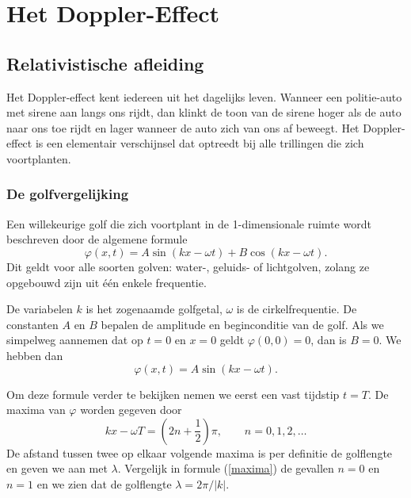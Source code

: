 \chapter{Het Doppler-Effect}


\section{Relativistische afleiding}
Het Doppler-effect kent iedereen uit het dagelijks leven. Wanneer een
politie-auto met sirene aan langs ons rijdt, dan klinkt de toon van de
sirene hoger als de auto naar ons toe rijdt en lager wanneer de auto
zich van ons af beweegt.  Het Doppler-effect is een elementair
verschijnsel dat optreedt bij alle trillingen die zich voortplanten.

\subsection{De golfvergelijking}
Een willekeurige golf die zich voortplant in de 1-dimensionale ruimte
wordt beschreven door de algemene formule
%
\begin{equation} 
\varphi(x,t) = A \sin(kx - \omega t) + B \cos(kx -\omega t) .
\end{equation}
%
Dit geldt voor alle soorten golven: water-, geluids- of lichtgolven,
zolang ze opgebouwd zijn uit \'e\'en enkele frequentie.

De variabelen $k$ is het zogenaamde golfgetal, $\omega$ is de
cirkelfrequentie. De constanten $A$ en $B$ bepalen de amplitude en
beginconditie van de golf. Als we simpelweg aannemen dat op $t=0$ en
$x = 0$ geldt $\varphi(0,0) = 0$, dan is $B = 0$. We hebben dan
%
\begin{equation} \label{golfVerg}
\varphi(x,t) = A \sin(kx -\omega t).
\end{equation}

Om deze formule verder te bekijken nemen we eerst een vast tijdstip $t
= T$. De maxima van $\varphi$ worden gegeven door
%
\begin{equation} \label{maxima}
kx - \omega T = (2n + \frac{1}{2}) \pi, \qquad n = 0,1,2,\ldots
\end{equation}
De afstand tussen twee op elkaar volgende maxima is per definitie de
golflengte en geven we aan met $\lambda$. Vergelijk in formule
(\ref{maxima}) de gevallen $n = 0$ en $n = 1$ en we zien dat de
golflengte $\lambda = 2\pi / |k|$.

